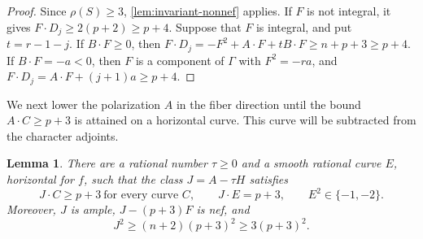 \documentclass[11pt,reqno]{amsart}
\numberwithin{equation}{section}
\newtheorem{lemma}[lemma]{Lemma}
\theoremstyle{remark}
\begin{document}
\begin{proof}
Since \(\rho(S)\geq3\), \cref{lem:invariant-nonnef} applies. If \(F\) is not integral, it gives \(F\cdot D_j\geq2(p+2)\geq p+4\). Suppose that \(F\) is integral, and put \(t=r-1-j\). If \(B\cdot F\geq0\), then
\(F\cdot D_j=-F^2+A\cdot F+tB\cdot F\geq n+p+3\geq p+4\).
If \(B\cdot F=-a<0\), then \(F\) is a component of \(\Gamma\) with \(F^2=-ra\), and
\(F\cdot D_j=A\cdot F+(j+1)a\geq p+4\).
\end{proof}

We next lower the polarization \(A\) in the fiber direction until the bound \(A\cdot C\geq p+3\) is attained on a horizontal curve. This curve will be subtracted from the character adjoints.

\begin{lemma}
\label{lem:fixed-threshold}
There are a rational number \(\tau\geq0\) and a smooth rational curve \(E\), horizontal for \(f\), such that the class \(J=A-\tau H\) satisfies
\begin{equation*}
 J\cdot C\geq p+3\ \text{for every curve }C,\qquad
 J\cdot E=p+3,\qquad E^2\in\{-1,-2\}.
\end{equation*}
Moreover, \(J\) is ample, \(J-(p+3)F\) is nef, and
\begin{equation*}
 J^2\geq(n+2)(p+3)^2\geq3(p+3)^2.
\end{equation*}
\end{lemma}
\end{document}
